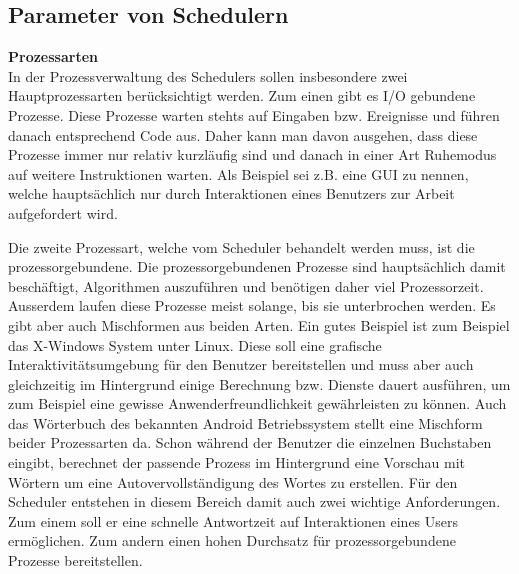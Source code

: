 \subsection{Parameter von Schedulern}
\textbf{Prozessarten}\\
In der Prozessverwaltung des Schedulers sollen insbesondere zwei Hauptprozessarten berücksichtigt werden. Zum einen gibt es I/O gebundene Prozesse. Diese Prozesse warten stehts auf Eingaben bzw. Ereignisse und führen danach entsprechend Code aus. Daher kann man davon ausgehen, dass diese Prozesse immer nur relativ kurzläufig sind und danach in einer Art Ruhemodus auf weitere Instruktionen warten. Als Beispiel sei z.B. eine GUI zu nennen, welche hauptsächlich nur durch Interaktionen eines Benutzers zur Arbeit aufgefordert wird.

Die zweite Prozessart, welche vom Scheduler behandelt werden muss, ist die prozessorgebundene. Die prozessorgebundenen Prozesse sind hauptsächlich damit beschäftigt, Algorithmen auszuführen und be\-nötigen daher viel Prozessorzeit. Ausserdem laufen diese Prozesse meist solange, bis sie unterbrochen werden.
Es gibt aber auch Mischformen aus beiden Arten. Ein gutes Beispiel ist zum Beispiel das X-Windows System unter Linux. Diese soll eine grafische Interaktivitätsumgebung für den Benutzer bereitstellen und muss aber auch gleichzeitig im Hintergrund einige Berechnung bzw. Dienste dauert ausführen, um zum Beispiel eine gewisse Anwenderfreundlichkeit gewähr\-leis\-ten zu können. 
Auch das Wörterbuch des bekannten Android Betriebssystem stellt eine Mischform beider Prozessarten da. Schon während der Benutzer die einzelnen Buchstaben eingibt, berechnet der passende Prozess im Hintergrund eine Vorschau mit Wörtern um eine Auto\-ver\-voll\-ständigung des Wortes zu erstellen.
Für den Scheduler entstehen in diesem Bereich damit auch zwei wichtige Anforderungen. Zum einem soll er eine schnelle Antwortzeit auf Interaktionen eines Users ermöglichen. Zum andern einen hohen Durchsatz für prozessorgebundene Prozesse bereitstellen.

